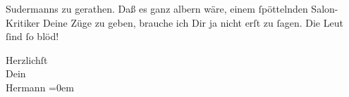                   Sudermanns zu gerathen. Daß es ganz albern
               wäre, einem{ }ſpöttelnden Salon-Kritiker Deine Züge zu geben, brauche ich Dir ja nicht
               erſt zu{ }ſagen. Die Leut{ }ſind{ }ſo blöd!\pend
           
\pstart
           Herzlichſt{\\[\baselineskip]}Dein{\\[\baselineskip]}\spacefill\mbox{Hermann}\pend
           \leftskip=0em{}\endnumbering{}  \newcommand{\dateiname}{L01242}\newcommand{\titel}{Hermann Bahr an Arthur Schnitzler, 15. 10. 1902}\newcommand{\editorInnen}{Herausgegeben von Martin Anton Müller}
